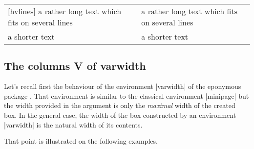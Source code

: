 \documentclass[dvipsnames]{article}%
\begin{document}
\begin{center}
\begin{NiceTabular}[width=9cm]{X[2,l]X[l]}[hvlines]
a rather long text which fits on several lines 
& a rather long text which fits on several lines \\
a shorter text & a shorter text
\end{NiceTabular}
\end{center}


\subsection{The columns V of varwidth}

\label{varwidth}


Let's recall first the behaviour of the environment |{varwidth}| of the
eponymous package . That environment is similar to the classical
environment |{minipage}| but the width provided in the argument is only the
\emph{maximal} width of the created box. In the general case, the width of the
box constructed by an environment |{varwidth}| is the natural width of its
contents.

\medskip
That point is illustrated on the following examples.

\medskip
\begin{Code}[width=6cm]
\end{Code}

\bigskip
\begin{Code}[width=6cm]
\end{Code}
\end{document}
